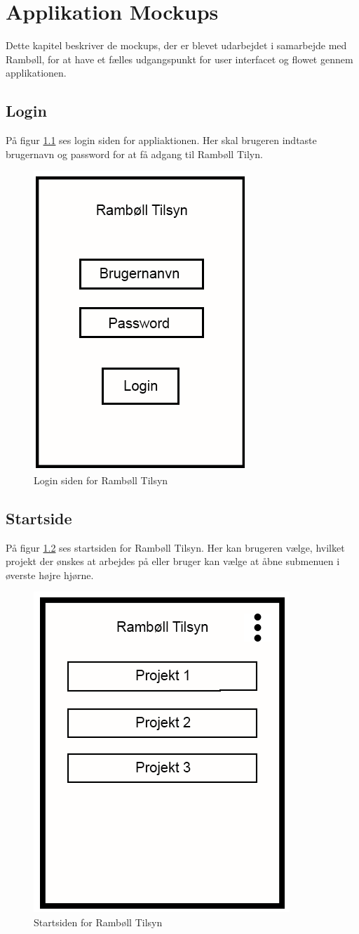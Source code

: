 \chapter{Applikation Mockups}
Dette kapitel beskriver de mockups, der er blevet udarbejdet i samarbejde med Rambøll, for at have et fælles udgangspunkt for user interfacet og flowet gennem applikationen. \\

\section{Login}\label{sec:LoginMock}
På figur \ref{fig:LoginMock} ses login siden for appliaktionen. Her skal brugeren indtaste brugernavn og password for at få adgang til Rambøll Tilyn.
\begin{figure}[H]
	\centering
	\includegraphics[width=0.4\linewidth]{MockUps/Mock/Ramboell-Login}
	\caption{Login siden for Rambøll Tilsyn}
	\label{fig:LoginMock}
\end{figure}

\clearpage

\section{Startside}\label{sec:StartMock}
På figur \ref{fig:StartMock} ses startsiden for Rambøll Tilsyn. Her kan brugeren vælge, hvilket projekt der ønskes at arbejdes på eller bruger kan vælge at åbne submenuen i øverste højre hjørne.
\begin{figure}[H]
	\centering
	\includegraphics[width=0.4\linewidth]{MockUps/Mock/Ramboell-Startside}
	\caption{Startsiden for Rambøll Tilsyn}
	\label{fig:StartMock}
\end{figure}

